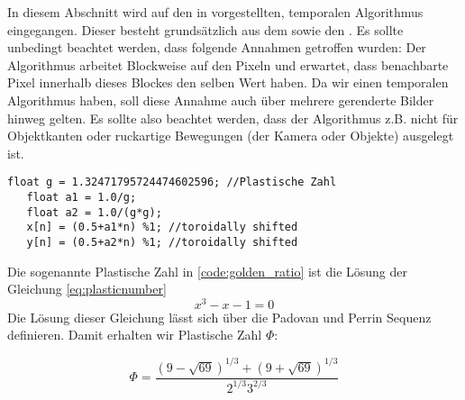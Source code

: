In diesem Abschnitt wird auf den in \cite{hal02158423} vorgestellten, temporalen Algorithmus eingegangen.
Dieser besteht grundsätzlich aus dem  sowie den 
. Es sollte unbedingt beachtet werden, dass folgende
Annahmen getroffen wurden: Der Algorithmus arbeitet Blockweise auf den Pixeln und erwartet, dass benachbarte
Pixel innerhalb dieses Blockes den selben Wert haben. Da wir einen temporalen Algorithmus haben, soll diese Annahme 
auch über mehrere gerenderte Bilder hinweg gelten. Es sollte also beachtet werden, dass der Algorithmus z.B. nicht 
für Objektkanten oder ruckartige Bewegungen (der Kamera oder Objekte) ausgelegt ist.
\cite{heitz:hal-02150657}

\cite{quasirandomsequencesbyRoberts}
\label{code:golden_ratio}
\begin{lstlisting}[style=CStyle]
   float g = 1.32471795724474602596; //Plastische Zahl
   float a1 = 1.0/g;
   float a2 = 1.0/(g*g);
   x[n] = (0.5+a1*n) %1; //toroidally shifted
   y[n] = (0.5+a2*n) %1; //toroidally shifted
\end{lstlisting}
Die sogenannte Plastische Zahl in \ref{code:golden_ratio} ist die Lösung der
Gleichung \ref{eq:plasticnumber}
\begin{equation}\label{eq:cubic}
   x^{3} - x - 1 = 0
\end{equation}
Die Lösung dieser Gleichung lässt sich über die Padovan und Perrin Sequenz
definieren. Damit erhalten wir Plastische Zahl $\Phi$:

\begin{equation} \label{eq:plasticnumber}
   \Phi = \frac{(9 - \sqrt{69})^{1/3} + (9 + \sqrt{69})^{1/3}}
               {2^{1/3}3^{2/3}}
\end{equation}

\cite{vanderlaanplasticnumber}
\cite{wolframalphaPlastic}
